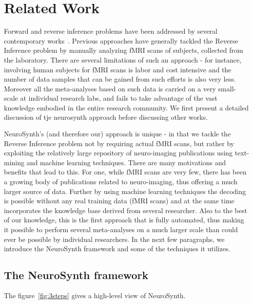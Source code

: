 \documentclass{article} %
\begin{document}
\section{Related Work}
Forward and reverse inference problems have been addressed by several contemporary works~\cite{schwartz2013mapping, PMSKBY12, sanmi2013multi, yarkoni2011large}. Previous approaches have generally tackled the Reverse Inference problem by manually analyzing fMRI scans of subjects, collected from the laboratory. There are several limitations of such an approach - for instance, involving human subjects for fMRI scans is labor and cost intensive and the number of data samples that can be gained from such efforts is also very less. Moreover all the meta-analyses based on such data is carried on a very small-scale at individual research labs, and fails to take advantage of the vast knowledge embodied in the entire research community. We first present a detailed discussion of tje neurosynth approach before discussing other works.%

NeuroSynth's (and therefore our) approach is unique - in that we tackle the Reverse Inference problem not by requiring actual fMRI scans, but rather by exploiting the relatively large repository of neuro-imaging publications using text-mining and machine learning techniques.  There are many motivations and benefits that lead to this. For one, while fMRI scans are very few, there has been a growing body of publications related to neuro-imaging, thus offering a much larger source of data. Further by using machine learning techniques the decoding is possible without any real training data (fMRI scans) and at the same time incorporates the knowledge base derived from several researcher. Also to the best of our knowledge, this is the first approach that is fully automated, thus making it possible to perform several meta-analyses on a much larger scale than could ever be possible by individual researchers.  In the next few paragraphs, we introduce the NeuroSynth framework and some of the techniques it utilizes.

\subsection{The NeuroSynth framework}
\label{sec:neurosynth_framework}
The figure~\ref{fig:3steps} gives a high-level view of  NeuroSynth. 
\end{document}
